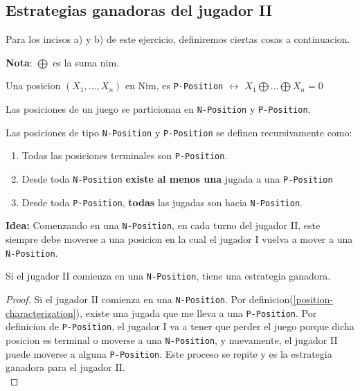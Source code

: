 \subsection{Estrategias ganadoras del jugador II}
Para los incisos a) y b) de este ejercicio, definiremos ciertas cosas a continuacion.

\textbf{Nota}: $\bigoplus$ es la suma nim.\\

\begin{theorem}
\label{bouton}
	Una posicion $(X_1, \dots, X_n)$ en Nim, es \texttt{P-Position} $\leftrightarrow$ $X_1 \bigoplus ... \bigoplus X_n = 0$ 
\end{theorem}

\begin{theorem}
\label{particion-movidas}
	Las posiciones de un juego se particionan en \texttt{N-Position} y \texttt{P-Position}.
\end{theorem}

\begin{theorem}
	\label{position-characterization}
	Las posiciones de tipo \texttt{N-Position} y \texttt{P-Position} se definen recursivamente como:
	\begin{enumerate}
		\item Todas las posiciones terminales son \texttt{P-Position}.
		\item Desde toda \texttt{N-Position} \textbf{existe al menos una} jugada a una \texttt{P-Position}
		\item Desde toda \texttt{P-Position}, \textbf{todas} las jugadas son hacia \texttt{N-Position}.
	\end{enumerate}
\end{theorem}

\textbf{Idea:} Comenzando en una \texttt{N-Position}, en cada turno del jugador II, este siempre debe moverse a una posicion en la cual el jugador I vuelva a mover a una \texttt{N-Position}.\\

\begin{theorem}
	\label{estrategia-ganadora}
	Si el jugador II comienza en una \texttt{N-Position}, tiene una estrategia ganadora.	
\end{theorem}
\begin{proof}
	Si el jugador II comienza en una \texttt{N-Position}. Por definicion(\ref{position-characterization}), existe una jugada que me lleva a una \texttt{P-Position}.
	Por definicion de \texttt{P-Position}, el jugador I va a tener que perder el juego porque dicha posicion es terminal o moverse a una \texttt{N-Position}, y nuevamente, el jugador II puede moverse a alguna \texttt{P-Position}. Este proceso se repite y es la estrategia ganadora para el jugador II.\\	
\end{proof}

